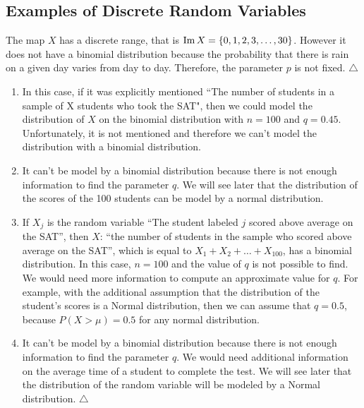 \subsection{Examples of Discrete Random Variables}

\begin{problem}
The map $X$ has a discrete range, that is $\operatorname{Im} X = \{ 0, 1, 2, 3, \ldots , 30 \}$. However it does not have a binomial distribution because the probability that there is rain on a given day varies from day to day. Therefore, the parameter $p$ is not fixed. \hfill $\triangle$
\end{problem}

\begin{problem}
\begin{enumerate}[label=\alph*)]
    \item In this case, if it was explicitly mentioned ``The number of students in a sample of X students who took the SAT", then we could model the distribution of $X$ on the binomial distribution with $n= 100$ and $q = 0.45$. Unfortunately, it is not mentioned and therefore we can't model the distribution with a binomial distribution.
    \item It can't be model by a binomial distribution because there is not enough information to find the parameter $q$. We will see later that the distribution of the scores of the 100 students can be model by a normal distribution.
    \item If $X_j$ is the random variable ``The student labeled $j$ scored above average on the SAT'', then $X$: ``the number of students in the sample who scored above average on the SAT'', which is equal to $X_1 + X_2 + \ldots + X_{100}$, has a binomial distribution. In this case, $n = 100$ and the value of $q$ is not possible to find. We would need more information to compute an approximate value for $q$. For example, with the additional assumption that the distribution of the student's scores is a Normal distribution, then we can assume that $q = 0.5$, because $P (X > \mu ) = 0.5$ for any normal distribution.  
    \item It can't be model by a binomial distribution because there is not enough information to find the parameter $q$. We would need additional information on the average time of a student to complete the test. We will see later that the distribution of the random variable will be modeled by a Normal distribution. \hfill $\triangle$
\end{enumerate}
\end{problem}

